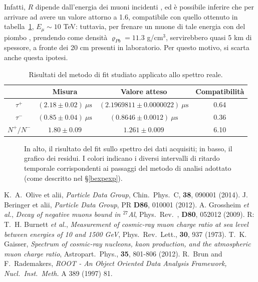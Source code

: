 \documentclass[10pt, oneside, a4paper]{article}   	%
\renewcommand{\rho}{\varrho}				%
\begin{document}
Infatti, $R$ dipende dall'energia dei muoni incidenti \cite{pb}, ed è possibile inferire che per arrivare ad avere un valore attorno a 1.6, compatibile con quello ottenuto in tabella~\ref{risultatiFinali}, $E_{\mu} \sim 10$ TeV: tuttavia, per frenare un muone di tale energia con del piombo \cite{pdg}, prendendo come densità $ \rho_{Pb} = 11.3 $ g/cm$^3$, servirebbero quasi 5 km di spessore, a fronte dei 20 cm presenti in laboratorio. Per questo motivo, si scarta anche questa ipotesi. %
%
\newpage
\begin{table}[p]
	\centering
	\begin{tabular}{cccc}
		\toprule
				& Misura	& Valore atteso 	& Compatibilità \\	
		\midrule
		$\tau^+$	& $(2.18 \pm 0.02) \ \mu \mbox{s}$ 	& $(2.1969811 \pm 0.0000022) \  \mu \mbox{s}$ 	& 0.64 	\\
		$\tau^-$	& $(0.85 \pm 0.04)  \ \mu \mbox{s}$ 	& $(0.8646 \pm 0.0012)  \ \mu \mbox{s}$ 		& 0.36	\\
		$N^+/N^-$	& $1.80 \pm 0.09$ 	& $1.261 \pm 0.009$ 		& 6.10	\\
		\bottomrule
	\end{tabular}
	\caption{Risultati del metodo di fit studiato applicato allo spettro reale.}
	\label{risultatiFinali}
\end{table}
%
\begin{figure}[p]
 \centerline{%
  }
  \caption{In alto, il risultato del fit sullo spettro dei dati acquisiti; in basso, il grafico dei residui. I colori indicano i diversi intervalli di ritardo temporale corrispondenti ai passaggi del metodo di analisi adottato (come descritto nel \S\ref{bexpexp}).}
  \label{fig:finale}
\end{figure}
%
\appendix


%
\begin{thebibliography}{4}
%
K.~A.~Olive et alii, \emph{Particle Data Group}, Chin.~Phys.~C, \textbf{38}, 090001 (2014).
%
J. Beringer et alii, \emph{Particle Data Group}, PR \textbf{D86}, 010001 (2012).
%
A. Grossheim \emph{et al.}, \emph{Decay of negative muons bound in $^{27}$Al}, Phys.~Rev.~, \textbf{D80}, 052012 (2009). 
%
 R: T.~H. Burnett \emph{et al.}, \emph{Measurement of cosmic-ray muon charge ratio at sea level between energies of 10 and 1500 GeV}, Phys.~Rev.~Lett., \textbf{30}, 937 (1973).
%
T.~K. Gaisser, \emph{Spectrum of cosmic-ray nucleons, kaon production, and the atmospheric muon charge ratio}, Astropart.~Phys., \textbf{35}, 801-806 (2012).
%
R.~Brun and F.~Rademakers, \emph{ROOT - An Object Oriented Data Analysis Framework, Nucl.~Inst.~Meth.} A 389 (1997) 81.
%
\end{thebibliography}
\end{document}
